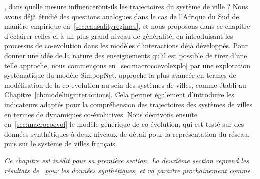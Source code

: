  , dans quelle mesure influenceront-ils les trajectoires du système de ville ? Nous avons déjà étudié des questions analogues dans le cas de l'Afrique du Sud de manière empirique en~\ref{sec:causalityregimes}, et nous proposons dans ce chapitre d'éclairer celles-ci à un plus grand niveau de généralité, en introduisant les processus de co-evolution dans les modèles d'interactions déjà développés. Pour donner une idée de la nature des enseignements qu'il est possible de tirer d'une telle approche, nous commençons en~\ref{sec:macrocoevolexplo} par une exploration systématique du modèle SimpopNet, approche la plus avancée en termes de modélisation de la co-evolution au sein des systèmes de villes, comme établi au Chapitre~\ref{ch:modelinginteractions}. Cela permet également d'introduire les indicateurs adaptés pour la compréhension des trajectoires des systèmes de villes en termes de dynamiques co-évolutives. Nous décrivons ensuite en~\ref{sec:macrocoevol} le modèle générique de co-évolution, qui est testé sur des données synthétiques à deux niveaux de détail pour la représentation du réseau, puis sur le système de villes français.




\stars


\textit{Ce chapitre est inédit pour sa première section. La deuxième section reprend les résultats de~\cite{} %
pour les données synthétiques, et va paraître prochainement comme~\cite{}. %
}















